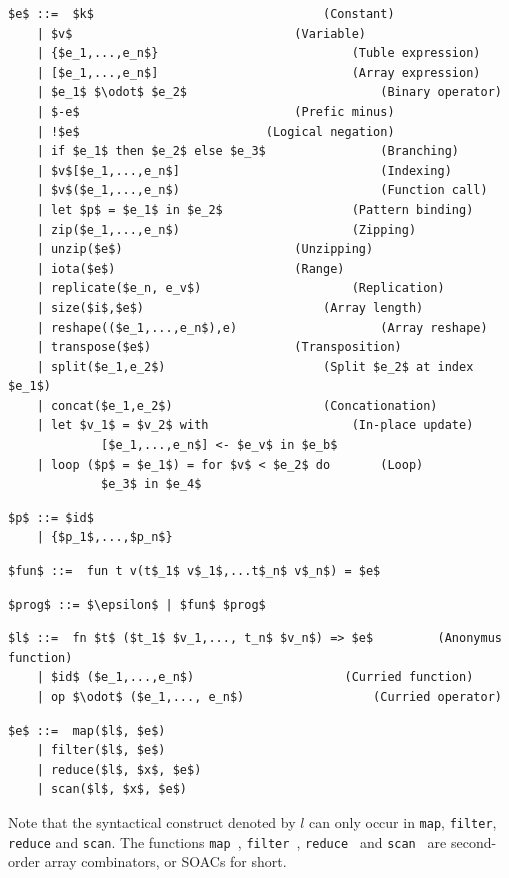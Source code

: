 \documentclass[11pt]{article}
\begin{document}
\begin{lstlisting}[numbers=none,frame=none]
$e$ ::=  $k$								(Constant)
    | $v$ 								(Variable)
    | {$e_1,...,e_n$} 							(Tuble expression)
    | [$e_1,...,e_n$] 							(Array expression)
    | $e_1$ $\odot$ $e_2$ 							(Binary operator)
    | $-e$ 								(Prefic minus)
    | !$e$ 							(Logical negation)
    | if $e_1$ then $e_2$ else $e_3$ 				(Branching)
    | $v$[$e_1,...,e_n$] 							(Indexing)
    | $v$($e_1,...,e_n$) 							(Function call)
    | let $p$ = $e_1$ in $e_2$					(Pattern binding)
    | zip($e_1,...,e_n$) 						(Zipping)
    | unzip($e$)						(Unzipping)
    | iota($e$) 						(Range)
    | replicate($e_n, e_v$) 					(Replication)
    | size($i$,$e$) 						(Array length)
    | reshape(($e_1,...,e_n$),e)					(Array reshape)
    | transpose($e$)					(Transposition)
    | split($e_1,e_2$)						(Split $e_2$ at index $e_1$)
    | concat($e_1,e_2$)						(Concationation)
    | let $v_1$ = $v_2$ with					(In-place update)
             [$e_1,...,e_n$] <- $e_v$ in $e_b$
    | loop ($p$ = $e_1$) = for $v$ < $e_2$ do		(Loop)
             $e_3$ in $e_4$
\end{lstlisting}
\begin{lstlisting}[numbers=none,frame=none]
$p$ ::= $id$ 
    | {$p_1$,...,$p_n$}
\end{lstlisting}

\begin{lstlisting}[numbers=none,frame=none]
$fun$ ::=  fun t v(t$_1$ v$_1$,...t$_n$ v$_n$) = $e$
\end{lstlisting}

\begin{lstlisting}[numbers=none,frame=none]
$prog$ ::= $\epsilon$ | $fun$ $prog$
\end{lstlisting}

\begin{lstlisting}[numbers=none,frame=none]
$l$ ::=  fn $t$ ($t_1$ $v_1,..., t_n$ $v_n$) => $e$			(Anonymus function)
    | $id$ ($e_1,...,e_n$)					   (Curried function)
    | op $\odot$ ($e_1,..., e_n$)			   	   (Curried operator)
\end{lstlisting}

\begin{lstlisting}[numbers=none,frame=none]
$e$ ::=  map($l$, $e$)					
    | filter($l$, $e$)
    | reduce($l$, $x$, $e$)
    | scan($l$, $x$, $e$)
\end{lstlisting}




Note that the syntactical construct denoted by $l$ can only occur in {\tt map}, {\tt filter}, {\tt reduce} and {\tt scan}.
The functions {\tt map }, {\tt filter }, {\tt reduce } and {\tt scan } are second-order array combinators, or SOACs for short.
\end{document}
